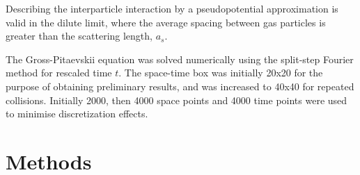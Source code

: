 \documentclass[10pt, twocolumn]{revtex4}    %
\providecommand{\e}[1]{\ensuremath{\times 10^{#1}}} %
\begin{document}
Describing the interparticle interaction by a pseudopotential approximation is valid in the dilute limit, where the average spacing between gas particles is greater than the scattering length, $a_s$. 


The Gross-Pitaevskii equation was solved numerically using the split-step Fourier method for rescaled time $t$. The space-time box was initially 20x20 for the purpose of obtaining preliminary results, and was increased to 40x40 for repeated collisions. Initially 2000, then 4000 space points and 4000 time points were used to minimise discretization effects. %


\section{Methods} \label{Methods}
\end{document}
